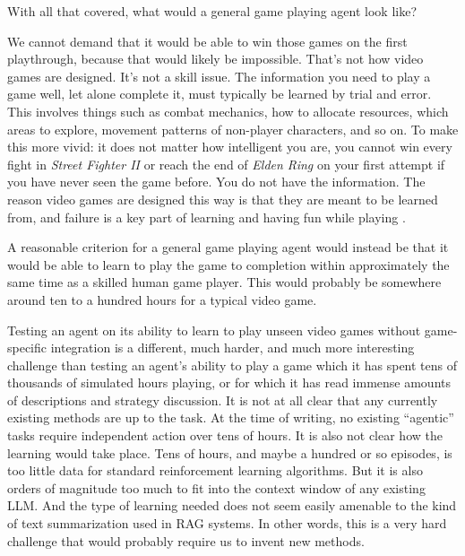 \documentclass[runningheads]{llncs}
\begin{document}
With all that covered, what would a general game playing agent look like?

We cannot demand that it would be able to win those games on the first playthrough, because that would likely be impossible. That's not how video games are designed. It's not a skill issue. The information you need to play a game well, let alone complete it, must typically be learned by trial and error. This involves things such as combat mechanics, how to allocate resources, which areas to explore, movement patterns of non-player characters, and so on. To make this more vivid: it does not matter how intelligent you are, you cannot win every fight in \textit{Street Fighter II} \cite{street_fighter_ii} or reach the end of \textit{Elden Ring} \cite{elden_ring} on your first attempt if you have never seen the game before. You do not have the information. The reason video games are designed this way is that they are meant to be learned from, and failure is a key part of learning and having fun while playing \cite{koster2013theory}.

A reasonable criterion for a general game playing agent would instead be that it would be able to learn to play the game to completion within approximately the same time as a skilled human game player. This would probably be somewhere around ten to a hundred hours for a typical video game.

Testing an agent on its ability to learn to play unseen video games without game-specific integration is a different, much harder, and much more interesting challenge than testing an agent's ability to play a game which it has spent tens of thousands of simulated hours playing, or for which it has read immense amounts of descriptions and strategy discussion. It is not at all clear that any currently existing methods are up to the task. At the time of writing, no existing ``agentic'' tasks require independent action over tens of hours. It is also not clear how the learning would take place. Tens of hours, and maybe a hundred or so episodes, is too little data for standard reinforcement learning algorithms. But it is also orders of magnitude too much to fit into the context window of any existing LLM. And the type of learning needed does not seem easily amenable to the kind of text summarization used in RAG systems. In other words, this is a very hard challenge that would probably require us to invent new methods.
\end{document}
